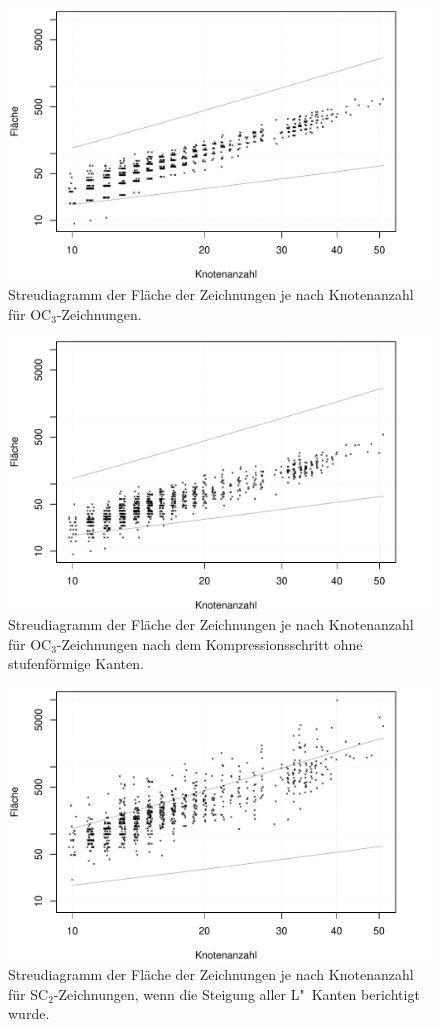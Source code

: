 \documentclass[a4paper]{scrreprt}
\theoremstyle{definition}
\begin{document}
\begin{figure}[h]
  \centering
  \includegraphics[width=.9\textwidth]{plots/area_orthogonal}
  \caption{Streudiagramm der Fläche der Zeichnungen je nach Knotenanzahl für OC$_3$-Zeichnungen. }
  \label{fig:ortho-noCompress}
\end{figure}
\begin{figure}[h]
  \centering
  \includegraphics[width=.9\textwidth]{plots/area_orthogonal_compressed}
  \caption{Streudiagramm der Fläche der Zeichnungen je nach Knotenanzahl für OC$_3$-Zeichnungen nach dem Kompressionsschritt ohne stufenförmige Kanten.}
  \label{fig:ortho-compress}
\end{figure}
\begin{figure}[h]
  \centering
  \includegraphics[width=.9\textwidth]{plots/area_smooth}
  \caption{Streudiagramm der Fläche der Zeichnungen je nach Knotenanzahl für SC$_2$-Zeichnungen, wenn die Steigung aller L"~Kanten berichtigt wurde.}
  \label{fig:smooth-noOpti}
\end{figure}
\end{document}
